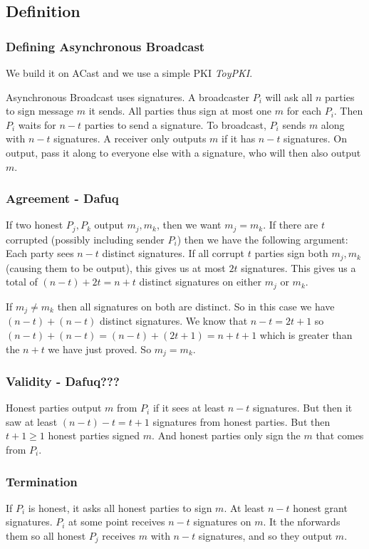 \documentclass[14pt]{beamer}
\begin{document}
    \subsection{Definition}
    \begin{frame}
        \frametitle{Defining Asynchronous Broadcast}
            We build it on ACast and we use a simple PKI \textit{ToyPKI}. 

            Asynchronous Broadcast uses signatures. A broadcaster $P_i$ will ask all $n$ parties to sign message $m$ it sends. All parties thus sign at most one $m$ for each $P_i$. Then $P_i$ waits for $n - t$ parties to send a signature. To broadcast, $P_i$ sends $m$ along with $n -t$ signatures. A receiver only outputs $m$ if it has $n - t$ signatures. On output, pass it along to everyone else with a signature, who will then also output $m$. 
    \end{frame}
    \begin{frame}
        \frametitle{Agreement - Dafuq}
            If two honest $P_j, P_k$ output $m_j, m_k$, then we want $m_j = m_k$. If there are $t$ corrupted (possibly including sender $P_i$) then we have the following argument: 
            Each party sees $n - t$ distinct signatures. If all corrupt $t$ parties sign both $m_j, m_k$ (causing them to be output), this gives us at most $2t$ signatures. This gives us a total of $(n -t) + 2t = n+t$ distinct signatures on either $m_j$ or $m_k$. 

            If $m_j \neq m_k$ then all signatures on both are distinct. So in this case we have $(n-t) + (n-t)$ distinct signatures. We know that $n-t = 2t +1$ so $(n-t) + (n-t) = (n-t) + (2t + 1) = n + t +1$ which is greater than the $n+t$ we have just proved. So $m_j = m_k$.
    \end{frame}

    \begin{frame}
        \frametitle{Validity - Dafuq???}
            Honest parties output $m$ from $P_i$ if it sees at least $n -t$ signatures. But then it saw at least $(n-t) - t = t + 1$ signatures from honest parties. But then $t + 1 \geq 1$ honest parties signed $m$. And honest parties only sign the $m$ that comes from $P_i$.
    \end{frame}

    \begin{frame}
        \frametitle{Termination}
            If $P_i$ is honest, it asks all honest parties to sign $m$. At least $n-t$ honest grant signatures. $P_i$ at some point receives $n-t$ signatures on $m$. It the nforwards them so all honest $P_j$ receives $m$ with $n-t$ signatures, and so they output $m$.
    \end{frame}
\end{document}
